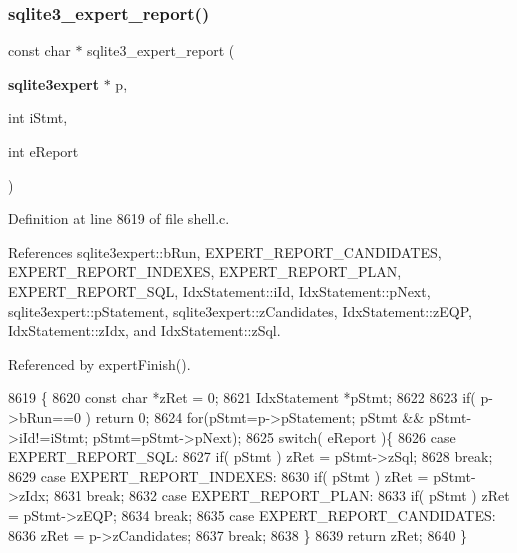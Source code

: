 \subsubsection{sqlite3\+\_\+expert\+\_\+report()}
{\footnotesize\ttfamily const char $\ast$ sqlite3\+\_\+expert\+\_\+report (\begin{DoxyParamCaption}\item[{\textbf{ sqlite3expert} $\ast$}]{p,  }\item[{int}]{i\+Stmt,  }\item[{int}]{e\+Report }\end{DoxyParamCaption})}



Definition at line 8619 of file shell.\+c.



References sqlite3expert\+::b\+Run, E\+X\+P\+E\+R\+T\+\_\+\+R\+E\+P\+O\+R\+T\+\_\+\+C\+A\+N\+D\+I\+D\+A\+T\+ES, E\+X\+P\+E\+R\+T\+\_\+\+R\+E\+P\+O\+R\+T\+\_\+\+I\+N\+D\+E\+X\+ES, E\+X\+P\+E\+R\+T\+\_\+\+R\+E\+P\+O\+R\+T\+\_\+\+P\+L\+AN, E\+X\+P\+E\+R\+T\+\_\+\+R\+E\+P\+O\+R\+T\+\_\+\+S\+QL, Idx\+Statement\+::i\+Id, Idx\+Statement\+::p\+Next, sqlite3expert\+::p\+Statement, sqlite3expert\+::z\+Candidates, Idx\+Statement\+::z\+E\+QP, Idx\+Statement\+::z\+Idx, and Idx\+Statement\+::z\+Sql.



Referenced by expert\+Finish().


\begin{DoxyCode}
8619                                                                            \{
8620   \textcolor{keyword}{const} \textcolor{keywordtype}{char} *zRet = 0;
8621   IdxStatement *pStmt;
8622 
8623   \textcolor{keywordflow}{if}( p->bRun==0 ) \textcolor{keywordflow}{return} 0;
8624   \textcolor{keywordflow}{for}(pStmt=p->pStatement; pStmt && pStmt->iId!=iStmt; pStmt=pStmt->pNext);
8625   \textcolor{keywordflow}{switch}( eReport )\{
8626     \textcolor{keywordflow}{case} EXPERT_REPORT_SQL:
8627       \textcolor{keywordflow}{if}( pStmt ) zRet = pStmt->zSql;
8628       \textcolor{keywordflow}{break};
8629     \textcolor{keywordflow}{case} EXPERT_REPORT_INDEXES:
8630       \textcolor{keywordflow}{if}( pStmt ) zRet = pStmt->zIdx;
8631       \textcolor{keywordflow}{break};
8632     \textcolor{keywordflow}{case} EXPERT_REPORT_PLAN:
8633       \textcolor{keywordflow}{if}( pStmt ) zRet = pStmt->zEQP;
8634       \textcolor{keywordflow}{break};
8635     \textcolor{keywordflow}{case} EXPERT_REPORT_CANDIDATES:
8636       zRet = p->zCandidates;
8637       \textcolor{keywordflow}{break};
8638   \}
8639   \textcolor{keywordflow}{return} zRet;
8640 \}
\end{DoxyCode}
\mbox{\label{shell_8c_aee3263e579c54c44539fc14dde760b05}} 
